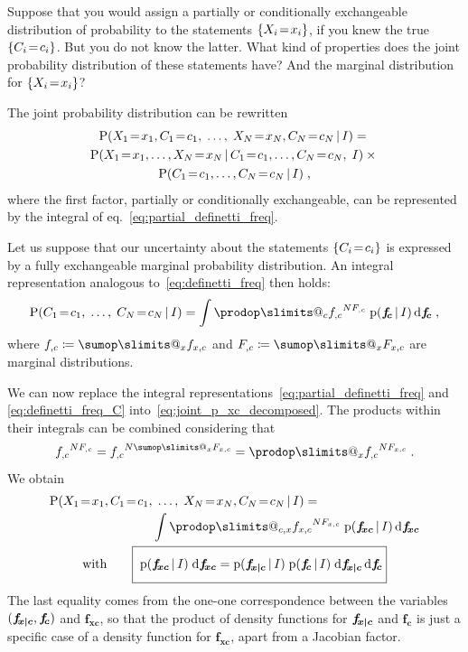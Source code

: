 \documentclass[\ifafour a4paper,12pt,\else a5paper,10pt,\fi%
onecolumn,oneside,article,%
british%
]{memoir}
\makeatletter
\theoremstyle{remark}
\theoremstyle{innote}
\def\sum{\DOTSI\sumop\slimits@}
\def\prod{\DOTSI\prodop\slimits@}
\newcommand*{\di}{\mathrm{d}}%
\newcommand*{\defd}{\coloneqq}
\DeclarePairedDelimiter\set{\{}{\}}
\newcommand*{\pf}{\mathrm{p}}%
\newcommand*{\p}{\mathrm{P}}%
\renewcommand*{\|}[1][]{\nonscript\,#1\vert\nonscript\,\mathopen{}}
\newcommand*{\eqn}{eq.}%
\renewcommand*{\=}{\TextOrMath\texteq\eq}
\newcommand*{\X}[1]{X_{#1}}
\newcommand*{\x}[1]{x_{#1}}
\newcommand*{\C}[1]{C_{#1}}
\newcommand*{\cc}[1]{c_{#1}}
\newcommand*{\fxc}{\bm{f_{\!x\bcond c}}}
\newcommand*{\fc}{\bm{f_{\!c}}}
\newcommand*{\fj}{\bm{f_{\!xc}}}
\newcommand*{\bcond}[1][]{\nonscript\,#1\bm{\vert}\nonscript\;\mathopen{}}
\makeatother
\begin{document}
Suppose that you would assign a partially or conditionally exchangeable
distribution of probability to the statements $\set{\X{i}\=\x{i}}$,
if you knew the true $\set{\C{i}\=\cc{i}}$. But you do not know the
latter. What kind of properties does the joint probability distribution of
these statements have? And the marginal distribution for
$\set{\X{i}\=\x{i}}$?

The joint probability distribution can be rewritten
\begin{multline}
  \label{eq:joint_p_xc_decomposed}
  \p( \X{1}\=\x{1}, \C{1}\=\cc{1},\; \dotsc,\;  \X{N}\=\x{N},\C{N}\=\cc{N}
  \| I) ={}\\
\p( \X{1}\=\x{1}, \dotsc, \X{N}\=\x{N}  \|
\C{1}\=\cc{1}, \dotsc,\C{N}\=\cc{N},\;    I)
\times{}\\
\p(\C{1}\=\cc{1}, \dotsc,\C{N}\=\cc{N}  \|    I)
  \;,
\end{multline}
where the first factor, partially or conditionally exchangeable, can be
represented by the integral of \eqn~\eqref{eq:partial_definetti_freq}.

Let us suppose that our uncertainty about the statements
$\set{\C{i}\=\cc{i}}$ is expressed by a fully exchangeable marginal
probability distribution. An integral representation analogous
to~\eqref{eq:definetti_freq} then holds:
\begin{equation}
  \label{eq:definetti_freq_C}
  \p( \C{1}\=\cc{1},\; \dotsc, \; \C{N}\=\cc{N} \| I) =
\int\prod_{c} {f_{,c}}^{N F_{,c}}\;   \pf(\fc \| I)\,\di\fc \;,
\end{equation}
where $f_{,c} \defd \sum_{x} f_{x,c}$ and $F_{,c} \defd \sum_{x} F_{x,c}$
are marginal distributions.


We can now replace the integral
representations~\eqref{eq:partial_definetti_freq} and
\eqref{eq:definetti_freq_C} into~\eqref{eq:joint_p_xc_decomposed}. The
products within their integrals can be combined considering that
\begin{equation}
  \label{eq:develop_prodfc}
  {f_{,c}}^{N F_{,c}} = {f_{,c}}^{N \sum_{x}F_{x,c}} =
  \prod_{x} {f_{,c}}^{N F_{x,c}} \;.
\end{equation}
We obtain
\begin{subequations}
  \label{eq:result}
  \begin{gather}
    \begin{multlined}[b][0.85\linewidth]
\p( \X{1}\=\x{1}, \C{1}\=\cc{1},\; \dotsc,\;  \X{N}\=\x{N},\C{N}\=\cc{N}
\| I) ={}\\
\int\prod_{c,x} {f_{x,c}}^{N F_{x, c}}\;  \pf(\fj\|I)\,\di\fj
\end{multlined}
\\
  \label{eq:factorizable}
\text{with}\qquad \boxed{\;\vphantom{\int}\pf(\fj\|I)\;\di\fj =
\pf(\fxc \| I)  \;
\pf(\fc \| I) \;\di\fxc\,\di\fc }
\end{gather}
\end{subequations}
The last equality comes from the one-one correspondence between the
variables $(\fxc,\fc)$ and $\fj$, so that the product of density functions
for $\fxc$ and $\fc$ is just a specific case of a density function for
$\fj$, apart from a Jacobian factor.
\end{document}
